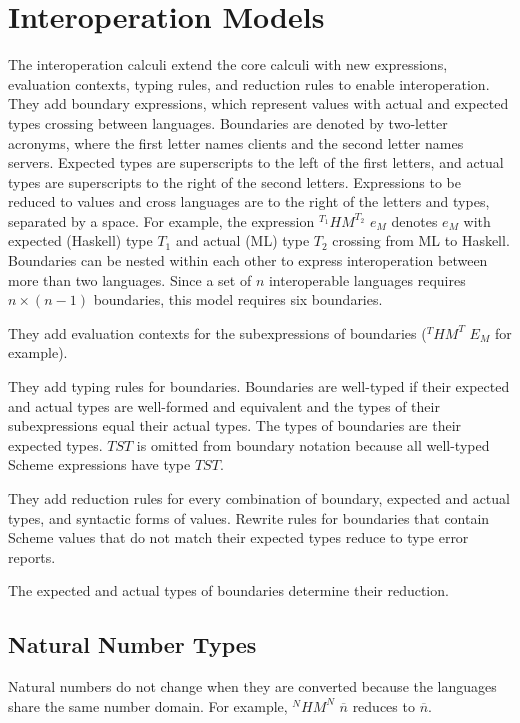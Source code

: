 \section{Interoperation Models}

The interoperation calculi extend the core calculi with new expressions, evaluation contexts, typing rules, and reduction rules to enable interoperation.  They add boundary expressions, which represent values with actual and expected types crossing between languages.  Boundaries are denoted by two-letter acronyms, where the first letter names clients and the second letter names servers.  Expected types are superscripts to the left of the first letters, and actual types are superscripts to the right of the second letters.  Expressions to be reduced to values and cross languages are to the right of the letters and types, separated by a space.  For example, the expression $^{T_{1}}HM^{T_{2}}$ $e_{M}$ denotes $e_{M}$ with expected (Haskell) type $T_{1}$ and actual (ML) type $T_{2}$ crossing from ML to Haskell.  Boundaries can be nested within each other to express interoperation between more than two languages.  Since a set of $n$ interoperable languages requires $n\times(n-1)$ boundaries, this model requires six boundaries.

They add evaluation contexts for the subexpressions of boundaries ($^{T}HM^{T}$ $E_{M}$ for example).

They add typing rules for boundaries.  Boundaries are well-typed if their expected and actual types are well-formed and equivalent and the types of their subexpressions equal their actual types.  The types of boundaries are their expected types.  $TST$ is omitted from boundary notation because all well-typed Scheme expressions have type $TST$.

They add reduction rules for every combination of boundary, expected and actual types, and syntactic forms of values.  Rewrite rules for boundaries that contain Scheme values that do not match their expected types reduce to type error reports.

The expected and actual types of boundaries determine their reduction.

\subsection{Natural Number Types}

Natural numbers do not change when they are converted because the languages share the same number domain.  For example, $^{N}HM^{N}$ $\overline{n}$ reduces to $\overline{n}$.

